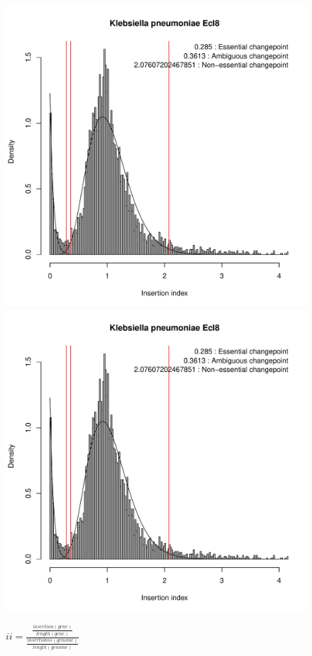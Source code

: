 \documentclass[a4paper,10pt]{article}
\begin{document}
\begin{figure}
\includegraphics[scale=0.2, page=11]{results-normalised-distance.pdf}
\includegraphics[scale=0.2, page=12]{results-normalised-distance.pdf}
\caption{$ii=\frac{\frac{insertion(gene)}{length(gene)}}{\frac{insertionss(genome)}{length(genome)}}$\newline
}
\end{figure}
\end{document}
